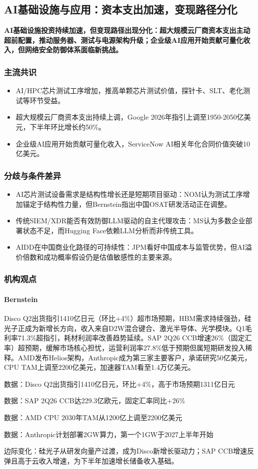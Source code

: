 \documentclass[11pt]{ctexart}
\begin{document}
\subsection{AI基础设施与应用：资本支出加速，变现路径分化}
\textbf{AI基础设施投资持续加速，但变现路径出现分化：超大规模云厂商资本支出主动超前配置，推动服务器、测试与电源架构升级；企业级AI应用开始贡献可量化收入，但网络安全防御体系面临新挑战。}
\subsubsection*{主流共识}
\begin{itemize}
  \item AI/HPC芯片测试工序增加，推高单颗芯片测试价值，探针卡、SLT、老化测试等环节受益。
  \item 超大规模云厂商资本支出持续上调，Google 2026年指引上调至1950-2050亿美元，下半年环比增长约50\%。
  \item 企业级AI应用开始贡献可量化收入，ServiceNow AI相关年化合同价值突破10亿美元。
\end{itemize}
\subsubsection*{分歧与条件差异}
\begin{itemize}
  \item AI芯片测试设备需求是结构性增长还是短期项目驱动：NOM认为测试工序增加锚定于结构性力量，但Bernstein指出中国OSAT研发活动正在调整。
  \item 传统SIEM/XDR能否有效防御LLM驱动的自主代理攻击：MS认为多数企业部署状态不足，而Hugging Face依赖LLM分析而非传统工具。
  \item AIDD在中国商业化路径的可持续性：JPM看好中国成本与监管优势，但AI溢价倍数和成功概率假设仍是估值敏感性的主要来源。
\end{itemize}
\subsubsection*{机构观点}
\paragraph{Bernstein} Disco Q2出货指引1410亿日元（环比+4\%）超市场预期，HBM需求持续强劲，硅光子正成为新增长方向，收入来自D2W混合键合、激光半导体、光学模块。Q1毛利率71.3\%超指引，耗材利润率改善趋势延续。SAP 2Q26 CCB增速26\%（固定汇率）超预期，缓解市场核心担忧，运营利润率27.8\%低于预期但属短期研发投入稀释。AMD发布Helios架构，Anthropic成为第三家主要客户，承诺研究50亿美元，CPU TAM上调至2200亿美元，加速器TAM看至1.4万亿美元。
{\small\color{refgray}数据：Disco Q2出货指引1410亿日元，环比+4\%，高于市场预期1311亿日元\par}
{\small\color{refgray}数据：SAP 2Q26 CCB达229.3亿欧元，固定汇率同比+26\%\par}
{\small\color{refgray}数据：AMD CPU 2030年TAM从1200亿上调至2200亿美元\par}
{\small\color{refgray}数据：Anthropic计划部署2GW算力，第一个1GW于2027上半年开始\par}
{\small\color{refgray}边际变化：硅光子从研发向量产过渡，成为Disco新增长驱动力；SAP CCB增速反弹且高于云收入增速，为下半年加速增长储备收入基础。\par}
\end{document}
